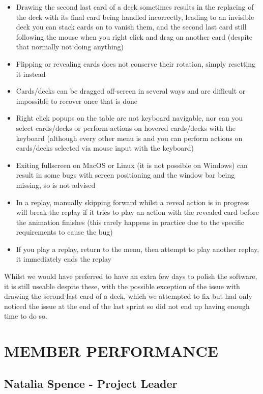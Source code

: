 \documentclass[a4paper]{project}
\begin{document}
		\begin{itemize}
			\item Drawing the second last card of a deck sometimes results in the replacing of the deck with its final card being handled incorrectly, leading to an invisible deck you can stack cards on to vanish them, and the second last card still following the mouse when you right click and drag on another card (despite that normally not doing anything)
			\item Flipping or revealing cards does not conserve their rotation, simply resetting it instead
			\item Cards/decks can be dragged off-screen in several ways and are difficult or impossible to recover once that is done
			\item Right click popups on the table are not keyboard navigable, nor can you select cards/decks or perform actions on hovered cards/decks with the keyboard (although every other menu is and you can perform actions on cards/decks selected via mouse input with the keyboard)
			\item Exiting fullscreen on MacOS or Linux (it is not possible on Windows) can result in some bugs with screen positioning and the window bar being missing, so is not advised
			\item In a replay, manually skipping forward whilst a reveal action is in progress will break the replay if it tries to play an action with the revealed card before the animation finishes (this rarely happens in practice due to the specific requirements to cause the bug)
			\item If you play a replay, return to the menu, then attempt to play another replay, it immediately ends the replay
		\end{itemize}
		
		Whilst we would have preferred to have an extra few days to polish the software, it is still useable despite these, with the possible exception of the issue with drawing the second last card of a deck, which we attempted to fix but had only noticed the issue at the end of the last sprint so did not end up having enough time to do so.
	
	\section{MEMBER PERFORMANCE}\label{sec:member-performance}
	
		\subsection{Natalia Spence - Project Leader}\label{subsec:performance-natalia-spence}
	
\end{document}
